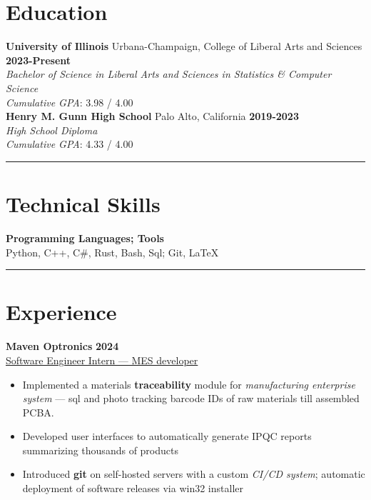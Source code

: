 \documentclass[11pt]{article}
\begin{document}

\section*{Education}

\textbf{University of Illinois} Urbana-Champaign, College of Liberal Arts and Sciences \hfill \textbf{2023-Present} \\
\emph{Bachelor of Science in Liberal Arts and Sciences in Statistics \& Computer Science} \\
\emph{Cumulative GPA}: 3.98 / 4.00 \\

\textbf{Henry M. Gunn High School} Palo Alto, California \hfill \textbf{2019-2023} \\
\emph{High School Diploma} \\
\emph{Cumulative GPA}: 4.33 / 4.00 \\

\vspace*{-5mm}
\rule{\textwidth}{0.1pt}
\vspace*{-10mm}

\section*{Technical Skills}
\textbf{Programming Languages; Tools} \\
Python, C++, C\#, Rust, Bash, Sql; Git, \LaTeX \\

\vspace*{-5mm}
\rule{\textwidth}{0.1pt}
\vspace*{-10mm}

\section*{Experience}

\textbf{Maven Optronics} \hfill \textbf{2024} \\
\underline{Software Engineer Intern --- MES developer}
\begin{itemize}
	\cramped
    \item Implemented a materials \textbf{traceability} module for \emph{manufacturing enterprise system} --- sql and photo tracking barcode IDs of raw materials till assembled PCBA.
    \item Developed user interfaces to automatically generate IPQC reports summarizing thousands of products
    \item Introduced \textbf{git} on self-hosted servers with a custom \emph{CI/CD system}; automatic deployment of software releases via win32 installer
\end{itemize}
\end{document}
